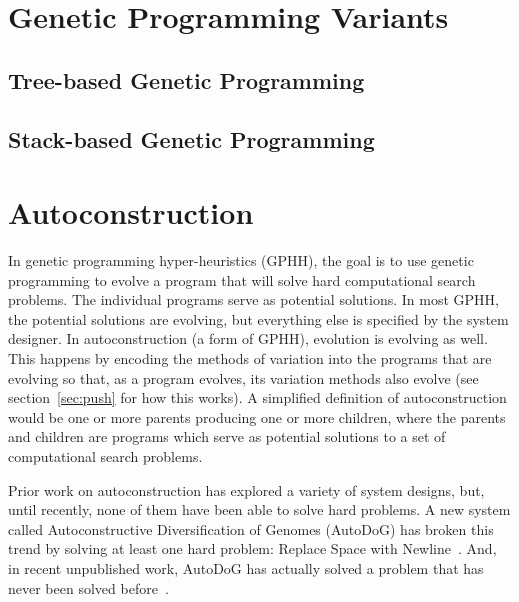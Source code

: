 \documentclass{sig-alternate}
\begin{document}
\section{Genetic Programming Variants}
\label{sec:gpvariants}

\subsection{Tree-based Genetic Programming}
\label{sec:tgp}

\subsection{Stack-based Genetic Programming}
\label{sec:sgp}

\section{Autoconstruction}
\label{sec:ac}
In genetic programming hyper-heuristics (GPHH), the goal is to use genetic programming to evolve a program that will solve hard computational search problems. The individual programs serve as potential solutions. In most GPHH, the potential solutions are evolving, but everything else is specified by the system designer.  In autoconstruction (a form of GPHH), evolution is evolving as well. This happens by encoding the methods of variation into the programs that are evolving so that, as a program evolves, its variation methods also evolve (see section~\ref{sec:push} for how this works). A simplified definition of autoconstruction would be one or more parents producing one or more children, where the parents and children are programs which serve as potential solutions to a set of computational search problems.

Prior work on autoconstruction has explored a variety of system designs, but, until recently, none of them have been able to solve hard problems. A new system called Autoconstructive Diversification of Genomes (AutoDoG) has broken this trend by solving at least one hard problem: Replace Space with Newline~\cite{spector:2016}. And, in recent unpublished work, AutoDoG has actually solved a problem that has never been solved before~\cite{eva:2017}.
\end{document}
